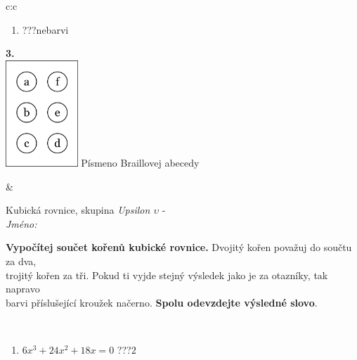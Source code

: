 \documentclass[10pt]{report}
\begin{document}
\begin{tabular}{c:c}
\begin{minipage}[c][104.5mm][t]{0.5\linewidth}
\begin{center}
\begin{minipage}{0.79\linewidth}
\begin{center}
\begin{varwidth}{\linewidth}
\begin{enumerate}
\item \quad \dotfill\; ???\;\dotfill \quad nebarvi
\end{enumerate}
\end{varwidth}
\end{center}
\end{minipage}
\begin{minipage}{0.20\linewidth}
\begin{center}
{\Huge\bfseries 3.} \\[2mm]
\includegraphics[height=40mm]{../images/braille.png}
{\small Písmeno Braillovej abecedy}
\end{center}
\end{minipage}
\end{center}
\end{minipage}
&
\begin{minipage}[c][104.5mm][t]{0.5\linewidth}
\begin{center}
\vspace{7mm}
{\huge Kubická rovnice, skupina \textit{Upsilon $\upsilon$} -}\\[5mm]
\textit{Jméno:}\phantom{xxxxxxxxxxxxxxxxxxxxxxxxxxxxxxxxxxxxxxxxxxxxxxxxxxxxxxxxxxxxxxxxx}\\[5mm]
\begin{minipage}{0.95\linewidth}
\begin{center}
\textbf{Vypočítej součet kořenů kubické rovnice.} Dvojitý kořen považuj do součtu za dva,\\trojitý kořen za tři. Pokud ti vyjde stejný výsledek jako je za otazníky, tak napravo\\barvi příslušející kroužek načerno. \textbf{Spolu odevzdejte výsledné slovo}.
\end{center}
\end{minipage}
\\[1mm]
\begin{minipage}{0.79\linewidth}
\begin{center}
\begin{varwidth}{\linewidth}
\begin{enumerate}
\Large
\item $6x^3+24x^2+18x=0$\quad \dotfill\; ???\;\dotfill \quad $2$

\end{enumerate}
\end{varwidth}
\end{center}
\end{minipage}
\end{center}
\end{minipage}
\end{tabular}
\end{document}
